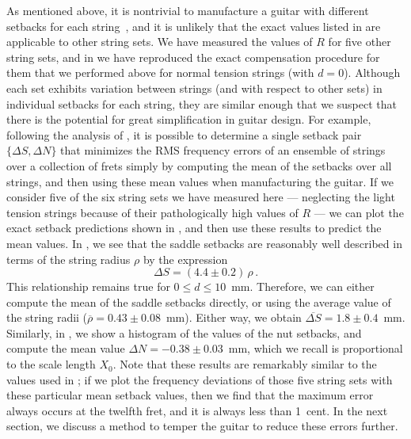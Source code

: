As mentioned above, it is nontrivial to manufacture a guitar with different setbacks for each string~\cite{ref:byers1996cgi}, and it is unlikely that the exact values listed in  are applicable to other string sets. We have measured the values of $R$ for five other string sets, and in  we have reproduced the exact compensation procedure for them that we performed above for normal tension strings (with $d = 0$). Although each set exhibits variation between strings (and with respect to other sets) in individual setbacks for each string, they are similar enough that we suspect that there is the potential for great simplification in guitar design. For example, following the analysis of , it is possible to determine a single setback pair $\{\Delta S, \Delta N\}$ that minimizes the RMS frequency errors of an ensemble of strings over a collection of frets simply by computing the mean of the setbacks over all strings, and then using these mean values when manufacturing the guitar. If we consider five of the six string sets we have measured here --- neglecting the light tension strings because of their pathologically high values of $R$ --- we can plot the exact setback predictions shown in , and then use these results to predict the mean values. In , we see that the saddle setbacks are reasonably well described in terms of the string radius $\rho$ by the expression
\begin{equation}
  \Delta S = (4.4 \pm 0.2)\, \rho\, .
\end{equation}
This relationship remains true for $0 \le d \le 10$~mm. Therefore, we can either compute the mean of the saddle setbacks directly, or using the average value of the string radii ($\overline{\rho} = 0.43 \pm 0.08$~mm). Either way, we obtain $\overline{\Delta S} = 1.8 \pm 0.4$~mm. Similarly, in , we show a histogram of the values of the nut setbacks, and compute the mean value $\Delta N = -0.38 \pm 0.03$~mm, which we recall is proportional to the scale length $X_0$. Note that these results are remarkably similar to the values used in ; if we plot the frequency deviations of those five string sets with these particular mean setback values, then we find that the maximum error always occurs at the twelfth fret, and it is always less than 1~cent. In the next section, we discuss a method to temper the guitar to reduce these errors further.

